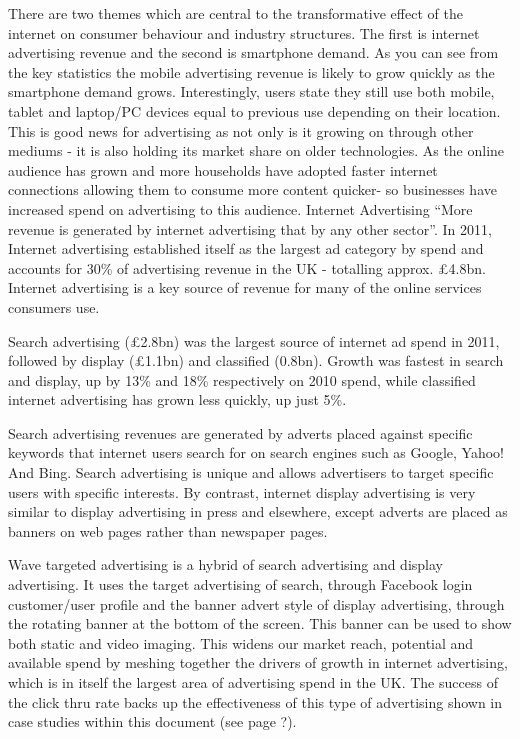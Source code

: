 \documentclass[letterpaper,10pt,openany,oneside,english]{sphinxmanual}
\begin{document}
There are two themes which are central to the transformative effect of the internet on consumer
behaviour and industry structures. The first is internet advertising revenue and the second is
smartphone demand. As you can see from the key statistics the mobile advertising revenue is
likely to grow quickly as the smartphone demand grows. Interestingly, users state they still use
both mobile, tablet and laptop/PC devices equal to previous use depending on their location.
This is good news for advertising as not only is it growing on through other mediums - it is also
holding its market share on older technologies. As the online audience has grown and more
households have adopted faster internet connections \textendash{} allowing them to consume more content
quicker- so businesses have increased spend on advertising to this audience.
Internet Advertising
“More revenue is generated by internet advertising that by any other sector”.
In 2011, Internet advertising established itself as the largest ad category by spend and accounts
for 30\% of advertising revenue in the UK - totalling approx. £4.8bn. Internet advertising is a key
source of revenue for many of the online services consumers use.

Search advertising (£2.8bn) was the largest source of internet ad spend in 2011, followed by
display (£1.1bn) and classified (0.8bn). Growth was fastest in search and display, up by 13\% and
18\% respectively on 2010 spend, while classified internet advertising has grown less quickly, up
just 5\%.

Search advertising revenues are generated by adverts placed against specific keywords that
internet users search for on search engines such as Google, Yahoo! And Bing. Search
advertising is unique and allows advertisers to target specific users with specific interests.
By contrast, internet display advertising is very similar to display advertising in press and
elsewhere, except adverts are placed as banners on web pages rather than newspaper pages.

Wave targeted advertising is a hybrid of search advertising and display advertising. It uses the
target advertising of search, through Facebook login customer/user profile and the banner
advert style of display advertising, through the rotating banner at the bottom of the screen.
This banner can be used to show both static and video imaging.
This widens our market reach, potential and available spend by meshing together the drivers of
growth in internet advertising, which is in itself the largest area of advertising spend in the UK.
The success of the click thru rate backs up the effectiveness of this type of advertising shown in
case studies within this document (see page ?).
\end{document}
